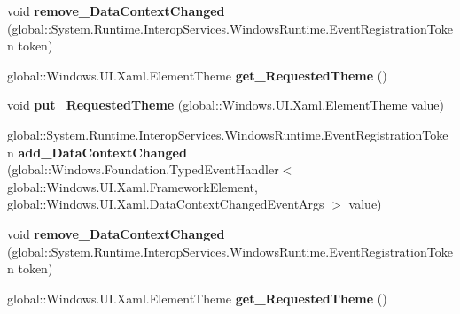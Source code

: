 \begin{DoxyCompactItemize}
\item 
\mbox{\label{interface_windows_1_1_u_i_1_1_xaml_1_1_i_framework_element2_a04219d0d5da2859d2265a4df37e64985}} 
void {\bfseries remove\+\_\+\+Data\+Context\+Changed} (global\+::\+System.\+Runtime.\+Interop\+Services.\+Windows\+Runtime.\+Event\+Registration\+Token token)
\item 
\mbox{\label{interface_windows_1_1_u_i_1_1_xaml_1_1_i_framework_element2_a969f6e448f093c9b73dff8beca767352}} 
global\+::\+Windows.\+U\+I.\+Xaml.\+Element\+Theme {\bfseries get\+\_\+\+Requested\+Theme} ()
\item 
\mbox{\label{interface_windows_1_1_u_i_1_1_xaml_1_1_i_framework_element2_a26887378d15655bc116fd7e94f99fc48}} 
void {\bfseries put\+\_\+\+Requested\+Theme} (global\+::\+Windows.\+U\+I.\+Xaml.\+Element\+Theme value)
\item 
\mbox{\label{interface_windows_1_1_u_i_1_1_xaml_1_1_i_framework_element2_a204d781ea5edc2c05e9d47534d5027ae}} 
global\+::\+System.\+Runtime.\+Interop\+Services.\+Windows\+Runtime.\+Event\+Registration\+Token {\bfseries add\+\_\+\+Data\+Context\+Changed} (global\+::\+Windows.\+Foundation.\+Typed\+Event\+Handler$<$ global\+::\+Windows.\+U\+I.\+Xaml.\+Framework\+Element, global\+::\+Windows.\+U\+I.\+Xaml.\+Data\+Context\+Changed\+Event\+Args $>$ value)
\item 
\mbox{\label{interface_windows_1_1_u_i_1_1_xaml_1_1_i_framework_element2_a04219d0d5da2859d2265a4df37e64985}} 
void {\bfseries remove\+\_\+\+Data\+Context\+Changed} (global\+::\+System.\+Runtime.\+Interop\+Services.\+Windows\+Runtime.\+Event\+Registration\+Token token)
\item 
\mbox{\label{interface_windows_1_1_u_i_1_1_xaml_1_1_i_framework_element2_a969f6e448f093c9b73dff8beca767352}} 
global\+::\+Windows.\+U\+I.\+Xaml.\+Element\+Theme {\bfseries get\+\_\+\+Requested\+Theme} ()
\item 
\mbox{\label{interface_windows_1_1_u_i_1_1_xaml_1_1_i_framework_element2_a26887378d15655bc116fd7e94f99fc48}} 

\end{DoxyCompactItemize}
